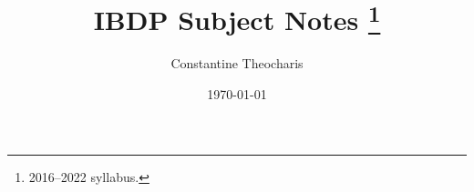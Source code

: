 

\title{IBDP Subject Notes
    \thanks{2016--2022 syllabus.}}

\author{Constantine Theocharis}

\date{\today}


\maketitle
\tableofcontents




